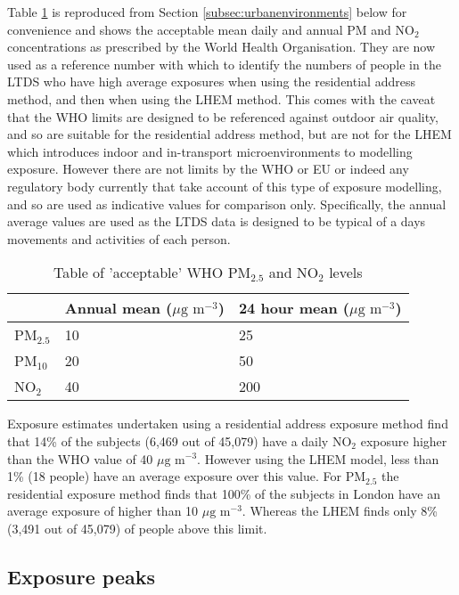 Table \ref{tab:whopmandno2levels} is reproduced from Section \ref{subsec:urbanenvironments} below for convenience and shows the acceptable mean daily and annual PM and NO$_{2}$ concentrations as prescribed by the World Health Organisation. They are now used as a reference number with which to identify the numbers of people in the LTDS who have high average exposures when using the residential address method, and then when using the LHEM method. This comes with the caveat that the WHO limits are designed to be referenced against outdoor air quality, and so are suitable for the residential address method, but are not for the LHEM which introduces indoor and in-transport microenvironments to modelling exposure. However there are not limits by the WHO or EU or indeed any regulatory body currently that take account of this type of exposure modelling, and so are used as indicative values for comparison only. Specifically, the annual average values are used as the LTDS data is designed to be typical of a days movements and activities of each person.

\begin{table}[H]
\centering
    \begin{tabular}{ | l | l | l |}
    \hline 
     & Annual mean ($\mu \text{g m}^{-3}$) & 24 hour mean ($\mu \text{g m}^{-3}$) \\ \hline
     PM$_{2.5}$ & 10 & 25\\ \hline
     PM$_{10}$ & 20 & 50\\ \hline
     NO$_{2}$ & 40 & 200\\ \hline
    \end{tabular}
\caption{Table of 'acceptable' WHO PM$_{2.5}$ and NO$_{2}$ levels}
\label{tab:whopmandno2levels}
\end{table}

Exposure estimates undertaken using a residential address exposure method find that 14\% of the subjects (6,469 out of 45,079) have a daily NO$_{2}$ exposure higher than the WHO value of 40 $\mu \text{g m}^{-3}$. However using the LHEM model, less than 1\% (18 people) have an average exposure over this value. For PM$_{2.5}$ the residential exposure method finds that 100\% of the subjects in London have an average exposure of higher than 10 $\mu \text{g m}^{-3}$. Whereas the LHEM finds only 8\% (3,491 out of 45,079) of people above this limit.

\subsection{Exposure peaks}
\label{subsec:exposure_peaks_by_age_group}

